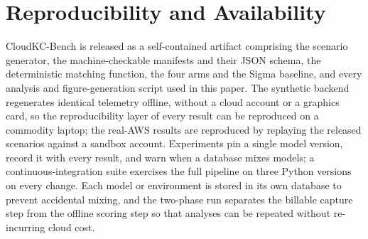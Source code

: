 \documentclass[journal]{IEEEtran}
\begin{document}
\section*{Reproducibility and Availability}
CloudKC-Bench is released as a self-contained artifact comprising the scenario generator, the
machine-checkable manifests and their JSON schema, the deterministic matching function, the four arms
and the Sigma baseline, and every analysis and figure-generation script used in this paper. The
synthetic backend regenerates identical telemetry offline, without a cloud account or a graphics card,
so the reproducibility layer of every result can be reproduced on a commodity laptop; the real-AWS
results are reproduced by replaying the released scenarios against a sandbox account. Experiments pin a
single model version, record it with every result, and warn when a database mixes models; a
continuous-integration suite exercises the full pipeline on three Python versions on every change. Each
model or environment is stored in its own database to prevent accidental mixing, and the two-phase run
separates the billable capture step from the offline scoring step so that analyses can be repeated
without re-incurring cloud cost.
\end{document}
